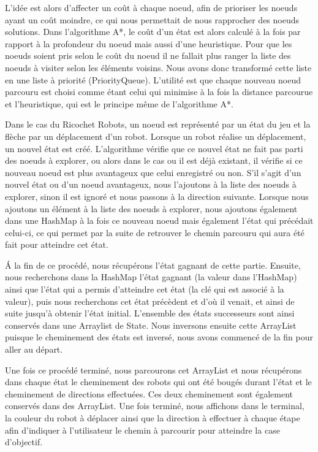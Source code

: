 \documentclass[a4paper, 12pt]{article}
\begin{document}
            L'idée est alors d'affecter un coût à chaque noeud, afin de prioriser les noeuds ayant un coût moindre, ce qui nous permettait de nous rapprocher des noeuds solutions. Dans l'algorithme A*, le coût d'un état est alors calculé à la fois par rapport à la profondeur du noeud mais aussi d'une heuristique. Pour que les noeuds soient pris selon le coût du noeud il ne fallait plus ranger la liste des noeuds à visiter selon les éléments voisins. Nous avons donc transformé cette liste en une liste à priorité (PriorityQueue). L'utilité est que chaque nouveau noeud parcouru est choisi comme étant celui qui minimise à la fois la distance parcourue et l'heuristique, qui est le principe même de l'algorithme A*.
            
            Dans le cas du Ricochet Robots, un noeud est représenté par un état du jeu et la flèche par un déplacement d'un robot. Lorsque un robot réalise un déplacement, un nouvel état est créé. L'algorithme vérifie que ce nouvel état ne fait pas parti des noeuds à explorer, ou alors dans le cas ou il est déjà existant, il vérifie si ce nouveau noeud est plus avantageux que celui enregistré ou non. S'il s'agit d'un nouvel état ou d'un noeud avantageux, nous l'ajoutons à la liste des noeuds à explorer, sinon il est ignoré et nous passons à la direction suivante. Lorsque nous ajoutons un élément à la liste des noeuds à explorer, nous ajoutons également dans une HashMap à la fois ce nouveau noeud mais également l'état qui précédait celui-ci, ce qui permet par la suite de retrouver le chemin parcouru qui aura été fait pour atteindre cet état.
            
            Á la fin de ce procédé, nous récupérons l'état gagnant de cette partie. Ensuite, nous recherchons dans la HashMap l'état gagnant (la valeur dans l'HashMap) ainsi que l'état qui a permis d'atteindre cet état (la clé qui est associé à la valeur), puis nous recherchons cet état précèdent et d'où il venait, et ainsi de suite jusqu'à obtenir l'état initial.
            L'ensemble des états successeurs sont ainsi conservés dans une Arraylist de State. Nous inversons ensuite cette ArrayList puisque le cheminement des états est inversé, nous avons commencé de la fin pour aller au départ.
            
            Une fois ce procédé terminé, nous parcourons cet ArrayList et nous récupérons dans chaque état le cheminement des robots qui ont été bougés durant l'état et le cheminement de directions effectuées. Ces deux cheminement sont également conservés dans des ArrayList. Une fois terminé, nous affichons dans le terminal, la couleur du robot à déplacer ainsi que la direction à effectuer à chaque étape afin d'indiquer à l'utilisateur le chemin à parcourir pour atteindre la case d'objectif.
            \newpage
            
\end{document}
